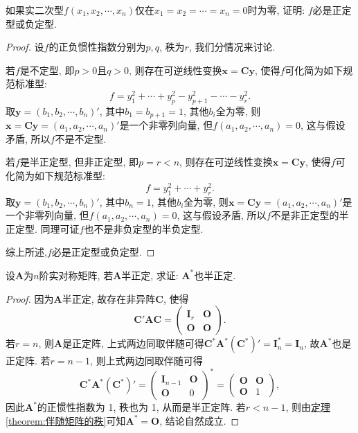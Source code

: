\documentclass[../../main.tex]{subfiles}
\begin{document}
\begin{proposition}\label{proposition:实二次型只在原点处为零必是正定或负定型}
如果实二次型$f(x_1, x_2, \cdots, x_n)$仅在$x_1 = x_2 = \cdots = x_n = 0$时为零, 证明: $f$必是正定型或负定型.
\end{proposition}
\begin{proof}
设$f$的正负惯性指数分别为$p,q$, 秩为$r$, 我们分情况来讨论.

若$f$是不定型, 即$p > 0$且$q > 0$, 则存在可逆线性变换$\boldsymbol{x}=\boldsymbol{C}\boldsymbol{y}$, 使得$f$可化简为如下规范标准型:
\[
f = y_1^2 + \cdots + y_p^2 - y_{p + 1}^2 - \cdots - y_r^2.
\]
取$\boldsymbol{y}=(b_1, b_2, \cdots, b_n)'$, 其中$b_1 = b_{p + 1} = 1$, 其他$b_i$全为零, 则$\boldsymbol{x}=\boldsymbol{C}\boldsymbol{y}=(a_1, a_2, \cdots, a_n)'$是一个非零列向量, 但$f(a_1, a_2, \cdots, a_n) = 0$, 这与假设矛盾, 所以$f$不是不定型.

若$f$是半正定型, 但非正定型, 即$p = r < n$, 则存在可逆线性变换$\boldsymbol{x}=\boldsymbol{C}\boldsymbol{y}$, 使得$f$可化简为如下规范标准型:
\[
f = y_1^2 + \cdots + y_r^2.
\]
取$\boldsymbol{y}=(b_1, b_2, \cdots, b_n)'$, 其中$b_n = 1$, 其他$b_i$全为零, 则$\boldsymbol{x}=\boldsymbol{C}\boldsymbol{y}=(a_1, a_2, \cdots, a_n)'$是一个非零列向量, 但$f(a_1, a_2, \cdots, a_n) = 0$, 这与假设矛盾, 所以$f$不是非正定型的半正定型. 同理可证$f$也不是非负定型的半负定型.

综上所述,$f$必是正定型或负定型. 
\end{proof}

\begin{proposition}\label{proposition:半正定阵的伴随也半正定}
设$\boldsymbol{A}$为$n$阶实对称矩阵, 若$\boldsymbol{A}$半正定, 求证: $\boldsymbol{A}^*$也半正定.
\end{proposition}
\begin{proof}
因为$\boldsymbol{A}$半正定, 故存在非异阵$\boldsymbol{C}$, 使得
\[
\boldsymbol{C}'\boldsymbol{A}\boldsymbol{C}=\begin{pmatrix}
\boldsymbol{I}_r & \boldsymbol{O} \\
\boldsymbol{O} & \boldsymbol{O}
\end{pmatrix}.
\]
若$r = n$, 则$\boldsymbol{A}$是正定阵, 上式两边同取伴随可得$\boldsymbol{C}^*\boldsymbol{A}^*(\boldsymbol{C}^*)'=\boldsymbol{I}_n^* = \boldsymbol{I}_n$, 故$\boldsymbol{A}^*$也是正定阵. 若$r = n - 1$, 则上式两边同取伴随可得
\[
\boldsymbol{C}^*\boldsymbol{A}^*(\boldsymbol{C}^*)'=\begin{pmatrix}
\boldsymbol{I}_{n - 1} & \boldsymbol{O} \\
\boldsymbol{O} & 0
\end{pmatrix}^*=\begin{pmatrix}
\boldsymbol{O} & \boldsymbol{O} \\
\boldsymbol{O} & 1
\end{pmatrix},
\]
因此$\boldsymbol{A}^*$的正惯性指数为 1, 秩也为 1, 从而是半正定阵. 若$r < n - 1$, 则由\hyperref[theorem:伴随矩阵的秩]{定理\ref{theorem:伴随矩阵的秩}}可知$\boldsymbol{A}^*=\boldsymbol{O}$, 结论自然成立.
\end{proof}
\end{document}
